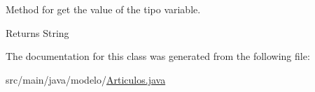 Method for get the value of the tipo variable. 

\begin{DoxyReturn}{Returns}
String 
\end{DoxyReturn}


The documentation for this class was generated from the following file\+:\begin{DoxyCompactItemize}
\item 
src/main/java/modelo/\mbox{\hyperlink{_articulos_8java}{Articulos.\+java}}\end{DoxyCompactItemize}

